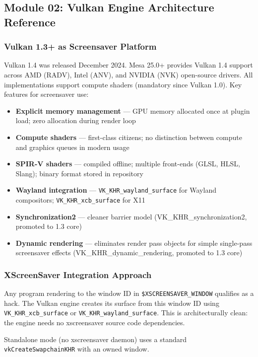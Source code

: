 \documentclass[11pt,letterpaper]{article}
\begin{document}
\subsection{Module 02: Vulkan Engine Architecture Reference}

\subsubsection{Vulkan 1.3+ as Screensaver Platform}

Vulkan 1.4 was released December 2024. Mesa 25.0+ provides Vulkan 1.4 support across AMD (RADV), Intel (ANV), and NVIDIA (NVK) open-source drivers. All implementations support compute shaders (mandatory since Vulkan 1.0). Key features for screensaver use:

\begin{itemize}
\item \textbf{Explicit memory management} --- GPU memory allocated once at plugin load; zero allocation during render loop
\item \textbf{Compute shaders} --- first-class citizens; no distinction between compute and graphics queues in modern usage
\item \textbf{SPIR-V shaders} --- compiled offline; multiple front-ends (GLSL, HLSL, Slang); binary format stored in repository
\item \textbf{Wayland integration} --- \texttt{VK\_KHR\_wayland\_surface} for Wayland compositors; \texttt{VK\_KHR\_xcb\_surface} for X11
\item \textbf{Synchronization2} --- cleaner barrier model (VK\_KHR\_synchronization2, promoted to 1.3 core)
\item \textbf{Dynamic rendering} --- eliminates render pass objects for simple single-pass screensaver effects (VK\_KHR\_dynamic\_rendering, promoted to 1.3 core)
\end{itemize}

\subsubsection{XScreenSaver Integration Approach}

Any program rendering to the window ID in \texttt{\$XSCREENSAVER\_WINDOW} qualifies as a hack. The Vulkan engine creates its surface from this window ID using \texttt{VK\_KHR\_xcb\_surface} or \texttt{VK\_KHR\_wayland\_surface}. This is architecturally clean: the engine needs no xscreensaver source code dependencies.

Standalone mode (no xscreensaver daemon) uses a standard \texttt{vkCreateSwapchainKHR} with an owned window.
\end{document}
